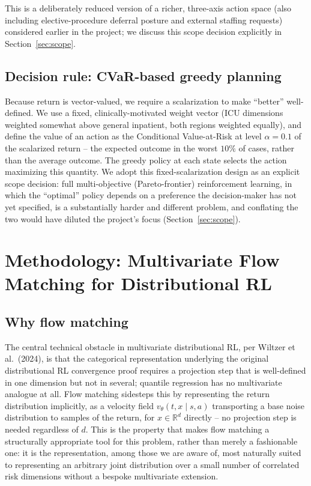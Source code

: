 \documentclass[11pt]{article}
\begin{document}
This is a deliberately reduced version of a richer, three-axis action space (also including elective-procedure deferral posture and external staffing requests) considered earlier in the project; we discuss this scope decision explicitly in Section~\ref{sec:scope}.

\subsection{Decision rule: CVaR-based greedy planning}
Because return is vector-valued, we require a scalarization to make ``better'' well-defined. We use a fixed, clinically-motivated weight vector (ICU dimensions weighted somewhat above general inpatient, both regions weighted equally), and define the value of an action as the Conditional Value-at-Risk at level $\alpha=0.1$ of the scalarized return -- the expected outcome in the worst $10\%$ of cases, rather than the average outcome. The greedy policy at each state selects the action maximizing this quantity. We adopt this fixed-scalarization design as an explicit scope decision: full multi-objective (Pareto-frontier) reinforcement learning, in which the ``optimal'' policy depends on a preference the decision-maker has not yet specified, is a substantially harder and different problem, and conflating the two would have diluted the project's focus (Section~\ref{sec:scope}).

\section{Methodology: Multivariate Flow Matching for Distributional RL}
\label{sec:method}

\subsection{Why flow matching}
The central technical obstacle in multivariate distributional RL, per Wiltzer et al.\ (2024), is that the categorical representation underlying the original distributional RL convergence proof requires a projection step that is well-defined in one dimension but not in several; quantile regression has no multivariate analogue at all. Flow matching sidesteps this by representing the return distribution implicitly, as a velocity field $v_\theta(t, x \mid s, a)$ transporting a base noise distribution to samples of the return, for $x \in \mathbb{R}^d$ directly -- no projection step is needed regardless of $d$. This is the property that makes flow matching a structurally appropriate tool for this problem, rather than merely a fashionable one: it is the representation, among those we are aware of, most naturally suited to representing an arbitrary joint distribution over a small number of correlated risk dimensions without a bespoke multivariate extension.
\end{document}
